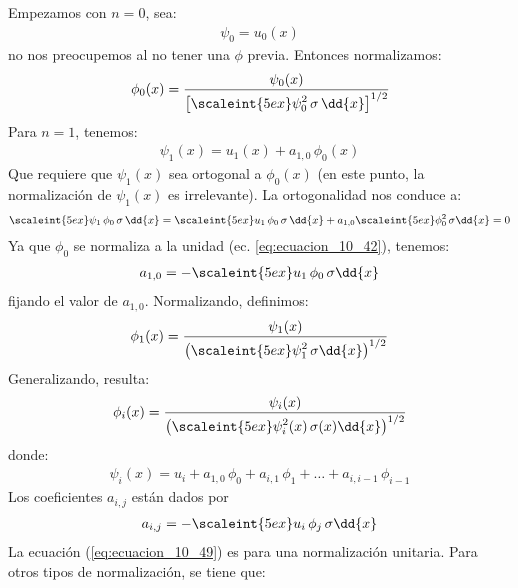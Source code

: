 Empezamos con $n = 0$, sea:
\begin{align}
\psi_{0} = u_{0}(x)
\label{eq:ecuacion_10_41}
\end{align}
no nos preocupemos al no tener una $\phi$ previa. Entonces normalizamos:
\begin{align}
\phi_{0}(x) = \dfrac{\psi_{0}(x)}{\left[ \displaystyle \scaleint{5ex} \psi_{0}^{2} \, \sigma  \, \dd{x} \right]^{1/2}}
\label{eq:ecuacion_10_42}
\end{align}
Para $n = 1$, tenemos:
\begin{align}
\psi_{1}(x) = u_{1}(x) + a_{1,0} \, \phi_{0}(x)
\label{eq:ecuacion_10_43}
\end{align}
Que requiere que $\psi_{1}(x)$ sea ortogonal a $\phi_{0}(x)$ (en este punto, la normalización de $\psi_{1}(x)$ es irrelevante). La ortogonalidad nos conduce a:
\begin{align}
\scaleint{5ex} \psi_{1} \, \phi_{0} \, \sigma \, \dd{x} = \scaleint{5ex} u_{1} \, \phi_{0} \, \sigma \, \dd{x} + a_{1,0} \scaleint{5ex} \phi_{0}^{2} \, \sigma \dd{x} = 0
\label{eq:ecuacion_10_44}
\end{align}
Ya que $\phi_{0}$ se normaliza a la unidad (ec. \ref{eq:ecuacion_10_42}), tenemos:
\begin{align}
a_{1,0} = - \scaleint{5ex} u_{1} \, \phi_{0} \, \sigma \dd{x}
\label{eq:ecuacion_10_45}
\end{align}
fijando el valor de $a_{1, 0}$. Normalizando, definimos:
\begin{align}
\phi_{1} (x) = \dfrac{\psi_{1}(x)}{\left( \displaystyle \scaleint{5ex} \psi_{1}^{2} \, \sigma \dd{x} \right)^{1/2}}
\label{eq:ecuacion_10_46}
\end{align}
Generalizando, resulta:
\begin{align}
\phi_{i}(x) = \dfrac{\psi_{i}(x)}{\left( \displaystyle \scaleint{5ex} \psi_{i}^{2}(x) \, \sigma (x) \dd{x} \right)^{1/2}}
\label{eq:ecuacion_10_47}
\end{align}
donde:
\begin{align}
\psi_{i}(x) = u_{i} + a_{1, 0} \, \phi_{0} + a_{i, 1} \, \phi_{1} + \ldots + a_{i, i-1} \, \phi_{i-1}
\label{eq:ecuacion_10_48}
\end{align}
Los coeficientes $a_{i, j}$ están dados por
\begin{align}
a_{i, j} = - \scaleint{5ex} u_{i} \, \phi_{j} \, \sigma  \dd{x}
\label{eq:ecuacion_10_49}
\end{align}
La ecuación (\ref{eq:ecuacion_10_49}) es para una normalización unitaria. Para otros tipos de normalización, se tiene que:
